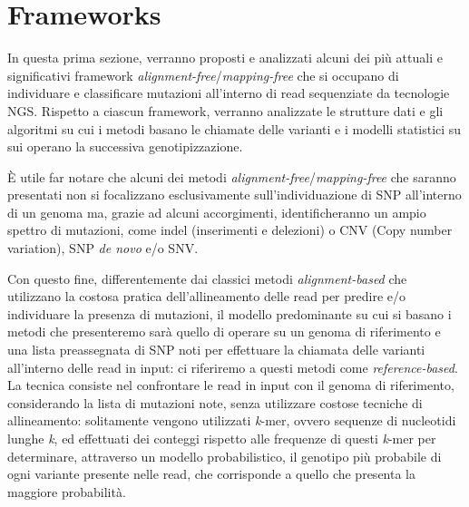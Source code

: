 \documentclass[../main.tex]{subfiles}
\begin{document}
\section{Frameworks}
\label{frameworks}

In questa prima sezione, verranno proposti e analizzati alcuni dei più attuali e significativi framework \textit{alignment-free}/\textit{mapping-free} che si occupano di individuare e classificare mutazioni all'interno di read sequenziate da tecnologie NGS. Rispetto a ciascun framework, verranno analizzate le strutture dati e gli algoritmi su cui i metodi basano le chiamate delle varianti e i modelli statistici su sui operano la successiva genotipizzazione.

È utile far notare che alcuni dei metodi \textit{alignment-free}/\textit{mapping-free} che saranno presentati non si focalizzano esclusivamente sull'individuazione di SNP all'interno di un genoma ma, grazie ad alcuni accorgimenti, identificheranno un ampio spettro di mutazioni, come indel (inserimenti e delezioni) o CNV (Copy number variation), SNP \textit{de novo} e/o SNV. 

Con questo fine, differentemente dai classici metodi \textit{alignment-based} che utilizzano la costosa pratica dell'allineamento delle read per predire e/o individuare la presenza di mutazioni, il modello predominante su cui si basano i metodi che presenteremo sarà quello di operare su un genoma di riferimento e una lista preassegnata di SNP noti per effettuare la chiamata delle varianti all'interno delle read in input: ci riferiremo a questi metodi come \textit{reference-based}. La tecnica consiste nel confrontare le read in input con il genoma di riferimento, considerando la lista di mutazioni note, senza utilizzare costose tecniche di allineamento: solitamente vengono utilizzati \textit{k}-mer, ovvero sequenze di nucleotidi lunghe \textit{k}, ed effettuati dei conteggi rispetto alle frequenze di questi \textit{k}-mer per determinare, attraverso un modello probabilistico, il genotipo più probabile di ogni variante presente nelle read, che corrisponde a quello che presenta la maggiore probabilità.
\end{document}
